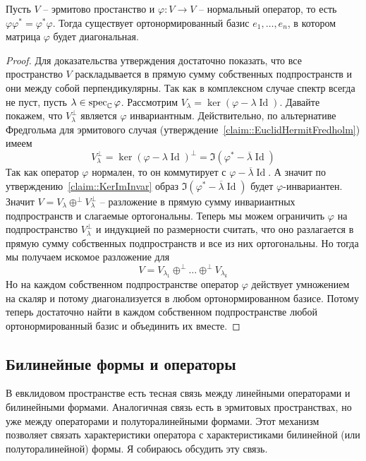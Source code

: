 \begin{claim}
Пусть $V$ -- эрмитово простанство и $\varphi\colon V\to V$ -- нормальный оператор, то есть $\varphi \varphi^* = \varphi^*\varphi$.
Тогда существует ортонормированный базис $e_1,\ldots, e_n$, в котором матрица $\varphi$ будет диагональная.
\end{claim}
\begin{proof}
Для доказательства утверждения достаточно показать, что все пространство $V$ раскладывается в прямую сумму собственных подпространств и они между собой перпендикулярны.
Так как в комплексном случае спектр всегда не пуст, пусть $\lambda \in \operatorname{spec}_\mathbb C \varphi$.
Рассмотрим $V_\lambda = \ker (\varphi - \lambda \operatorname{Id})$.
Давайте покажем, что $V_\lambda^\perp$ является $\varphi$ инвариантным.
Действительно, по альтернативе Фредгольма для эрмитового случая (утверждение~\ref{claim::EuclidHermitFredholm}) имеем
\[
V_\lambda^\perp =\ker (\varphi - \lambda \operatorname{Id})^\perp = \Im (\varphi^* -\overline{\lambda}\operatorname{Id})
\]
Так как оператор $\varphi$ нормален, то он коммутирует с $\varphi -\overline{\lambda}\operatorname{Id}$.
А значит по утверждению~\ref{claim::KerImInvar} образ $\Im (\varphi^* -\overline{\lambda}\operatorname{Id})$ будет $\varphi$-инвариантен.
Значит $V = V_\lambda \oplus^\perp V_\lambda^\perp$ -- разложение в прямую сумму инвариантных подпространств и слагаемые ортогональны.
Теперь мы можем ограничить $\varphi$ на подпространство $V_\lambda^\perp$ и индукцией по размерности считать, что оно разлагается в прямую сумму собственных подпространств и все из них ортогональны.
Но тогда мы получаем искомое разложение для
\[
V = V_{\lambda_1}\oplus^\perp \ldots \oplus^\perp V_{\lambda_k}
\]
Но на каждом собственном подпространстве оператор $\varphi$ действует умножением на скаляр и потому диагонализуется в любом ортонормированном базисе.
Потому теперь достаточно найти в каждом собственном подпространстве любой ортонормированный базис и объединить их вместе.
\end{proof}

\subsection{Билинейные формы и операторы}
\label{section::BilinOper}

В евклидовом пространстве есть тесная связь между линейными операторами и билинейными формами.
Аналогичная связь есть в эрмитовых пространствах, но уже между операторами и полуторалинейными формами.
Этот механизм позволяет связать характеристики оператора с характеристиками билинейной (или полуторалинейной) формы.
Я собираюсь обсудить эту связь.


